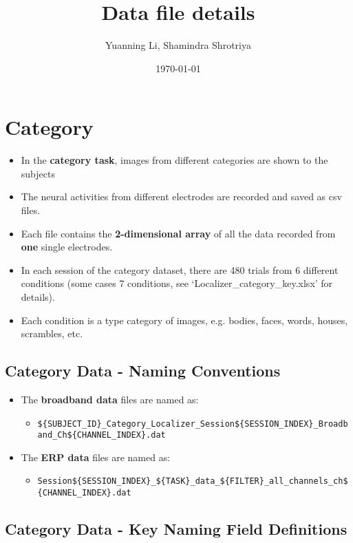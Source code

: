 \documentclass[11pt]{article}
\author{Yuanning Li, Shamindra Shrotriya}
\date{\today}
\title{Data file details}
\begin{document}
\tableofcontents


\section{Category}
\label{sec:org93645e8}

\begin{itemize}
\item In the \textbf{category task}, images from different categories are shown to the subjects
\item The neural activities from different electrodes are recorded and saved as csv files.
\item Each file contains the \textbf{2-dimensional array} of all the data recorded from \textbf{one} single electrodes.
\item In each session of the category dataset, there are 480 trials from 6 different conditions (some cases 7 conditions, see ‘Localizer\_category\_key.xlsx’ for details).
\item Each condition is a type category of images, e.g. bodies, faces, words, houses, scrambles, etc.
\end{itemize}

\subsection{Category Data - Naming Conventions}
\label{sec:orgd24bb0b}

\begin{itemize}
\item The \textbf{broadband data} files are named as:
\begin{itemize}
\item \texttt{\$\{SUBJECT\_ID\}\_Category\_Localizer\_Session\$\{SESSION\_INDEX\}\_Broadband\_Ch\$\{CHANNEL\_INDEX\}.dat}
\end{itemize}

\item The \textbf{ERP data} files are named as:
\begin{itemize}
\item \texttt{Session\$\{SESSION\_INDEX\}\_\$\{TASK\}\_data\_\$\{FILTER\}\_all\_channels\_ch\$\{CHANNEL\_INDEX\}.dat}
\end{itemize}
\end{itemize}


\subsection{Category Data - Key Naming Field Definitions}
\label{sec:org477ffbc}
\end{document}

